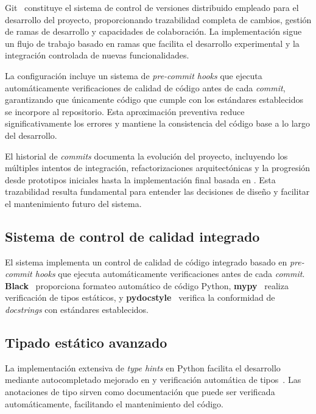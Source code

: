 Git~\cite{git_docs} constituye el sistema de control de versiones distribuido empleado para el desarrollo del proyecto, proporcionando trazabilidad completa de cambios, gestión de ramas de desarrollo y capacidades de colaboración. La implementación sigue un flujo de trabajo basado en ramas que facilita el desarrollo experimental y la integración controlada de nuevas funcionalidades.

La configuración incluye un sistema de \textit{\gls{pre-commit hooks}} que ejecuta automáticamente verificaciones de calidad de código antes de cada \textit{commit}, garantizando que únicamente código que cumple con los estándares establecidos se incorpore al repositorio. Esta aproximación preventiva reduce significativamente los errores y mantiene la consistencia del código base a lo largo del desarrollo.

El historial de \textit{commits} documenta la evolución del proyecto, incluyendo los múltiples intentos de integración, refactorizaciones arquitectónicas y la progresión desde prototipos iniciales hasta la implementación final basada en . Esta trazabilidad resulta fundamental para entender las decisiones de diseño y facilitar el mantenimiento futuro del sistema.

\subsection{Sistema de control de calidad integrado}
\label{subsec:control_calidad_integrado}

El sistema implementa un control de calidad de código integrado basado en \textit{\gls{pre-commit hooks}} que ejecuta automáticamente verificaciones antes de cada \textit{commit}. \textbf{Black}~\cite{black_docs} proporciona formateo automático de código Python, \textbf{mypy}~\cite{mypy_docs} realiza verificación de tipos estáticos, y \textbf{pydocstyle}~\cite{pydocstyle_docs} verifica la conformidad de \textit{docstrings} con estándares establecidos.

\subsection{Tipado estático avanzado}
\label{subsec:tipado_estatico}

La implementación extensiva de \textit{\gls{type hints}} en Python facilita el desarrollo mediante autocompletado mejorado en  y verificación automática de tipos~\cite{mypy_docs}. Las anotaciones de tipo sirven como documentación que puede ser verificada automáticamente, facilitando el mantenimiento del código.

